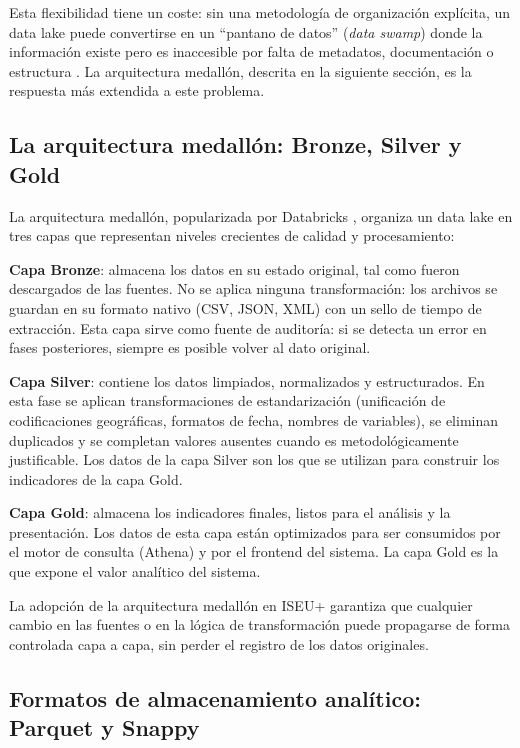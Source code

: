 Esta flexibilidad tiene un coste: sin una metodología de organización explícita, un data lake puede convertirse en un ``pantano de datos'' (\textit{data swamp}) donde la información existe pero es inaccesible por falta de metadatos, documentación o estructura \parencite{Inmon2016DataLakeWarehouse}. La arquitectura medallón, descrita en la siguiente sección, es la respuesta más extendida a este problema.

\subsection{La arquitectura medallón: Bronze, Silver y Gold}

La arquitectura medallón, popularizada por Databricks \parencite{Databricks2021MedallionArch}, organiza un data lake en tres capas que representan niveles crecientes de calidad y procesamiento:

\textbf{Capa Bronze}: almacena los datos en su estado original, tal como fueron descargados de las fuentes. No se aplica ninguna transformación: los archivos se guardan en su formato nativo (CSV, JSON, XML) con un sello de tiempo de extracción. Esta capa sirve como fuente de auditoría: si se detecta un error en fases posteriores, siempre es posible volver al dato original.

\textbf{Capa Silver}: contiene los datos limpiados, normalizados y estructurados. En esta fase se aplican transformaciones de estandarización (unificación de codificaciones geográficas, formatos de fecha, nombres de variables), se eliminan duplicados y se completan valores ausentes cuando es metodológicamente justificable. Los datos de la capa Silver son los que se utilizan para construir los indicadores de la capa Gold.

\textbf{Capa Gold}: almacena los indicadores finales, listos para el análisis y la presentación. Los datos de esta capa están optimizados para ser consumidos por el motor de consulta (Athena) y por el frontend del sistema. La capa Gold es la que expone el valor analítico del sistema.

La adopción de la arquitectura medallón en ISEU+ garantiza que cualquier cambio en las fuentes o en la lógica de transformación puede propagarse de forma controlada capa a capa, sin perder el registro de los datos originales.

\subsection{Formatos de almacenamiento analítico: Parquet y Snappy}

